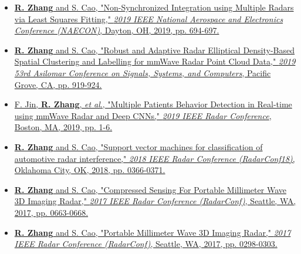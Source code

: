 \documentclass[10pt,letter,ragged2e,withhyper]{leozhang}
\newcommand{\etal}{\textit{et al}.}
\begin{document}
\begin{itemize}
  \item \href{https://ieeexplore.ieee.org/abstract/document/9058256}{{\bf R. Zhang} and S. Cao, "Non-Synchronized Integration using Multiple Radars via Least Squares Fitting," {\it 2019 IEEE National Aerospace and Electronics Conference (NAECON)}, Dayton, OH, 2019, pp. 694-697.}
  \item \href{https://ieeexplore.ieee.org/abstract/document/9048869}{{\bf R. Zhang} and S. Cao, "Robust and Adaptive Radar Elliptical Density-Based Spatial Clustering and Labelling for mmWave Radar Point Cloud Data," {\it 2019 53rd Asilomar Conference on Signals, Systems, and Computers}, Pacific Grove, CA, pp. 919-924.}
  \item \href{https://ieeexplore.ieee.org/document/8835656}{F. Jin, {\bf R. Zhang}, \etal{}, "Multiple Patients Behavior Detection in Real-time using mmWave Radar and Deep CNNs," {\it 2019 IEEE Radar Conference}, Boston, MA, 2019, pp. 1-6.}
  \item \href{https://ieeexplore.ieee.org/abstract/document/8378586}{{\bf R. Zhang} and S. Cao, "Support vector machines for classification of automotive radar interference," {\it 2018 IEEE Radar Conference (RadarConf18)}, Oklahoma City, OK, 2018, pp. 0366-0371.}
  \item \href{http://ieeexplore.ieee.org/document/7944286}{{\bf R. Zhang} and S. Cao, "Compressed Sensing For Portable Millimeter Wave 3D Imaging Radar," {\it 2017 IEEE Radar Conference (RadarConf)}, Seattle, WA, 2017, pp. 0663-0668.}
  \item \href{http://ieeexplore.ieee.org/abstract/document/7944216}{{\bf R. Zhang} and S. Cao, "Portable Millimeter Wave 3D Imaging Radar," {\it 2017 IEEE Radar Conference (RadarConf)}, Seattle, WA, 2017, pp. 0298-0303.}
\end{itemize}




\end{document}
